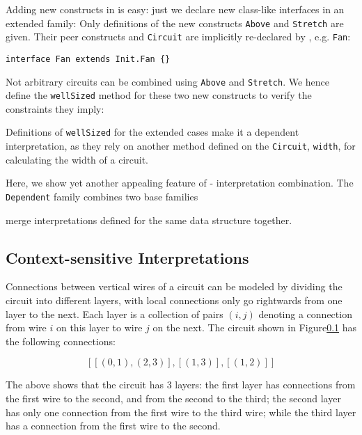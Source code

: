 Adding new constructs in \name is easy: just we declare new class-like
interfaces in an extended family:
Only definitions of the new constructs \texttt{Above} and \texttt{Stretch} are given.
Their peer constructs and \texttt{Circuit} are implicitly re-declared by \name,
e.g. \texttt{Fan}:

\begin{lstlisting}
interface Fan extends Init.Fan {}
\end{lstlisting}

Not arbitrary circuits can be combined using \texttt{Above} and \texttt{Stretch}.
We hence define the \texttt{wellSized} method for these two new constructs to
verify the constraints they imply:

Definitions of \texttt{wellSized} for the extended cases make it a dependent interpretation, as they
rely on another method defined on the \texttt{Circuit}, \texttt{width}, for calculating the width of a circuit.

Here, we show yet another appealing feature of \name - interpretation combination.
The \texttt{Dependent} family combines two base families

merge interpretations defined for the same data structure together.

\subsection{Context-sensitive Interpretations}
Connections between vertical wires of a circuit can be modeled by dividing the
circuit into different layers, with local connections only go rightwards from
one layer to the next. Each layer is a collection of pairs $(i,j)$ denoting a
connection from wire $i$ on this layer to wire $j$ on the next. The circuit shown in
Figure\ref{} has the following connections:

$$[[(0,1),(2,3)],[(1,3)],[(1,2)]]$$

The above shows that the circuit has 3 layers: the first layer has connections
from the first wire to the second, and from the second to the third; the second
layer has only one connection from the first wire to the third wire; while the
third layer has a connection from the first wire to the second.

